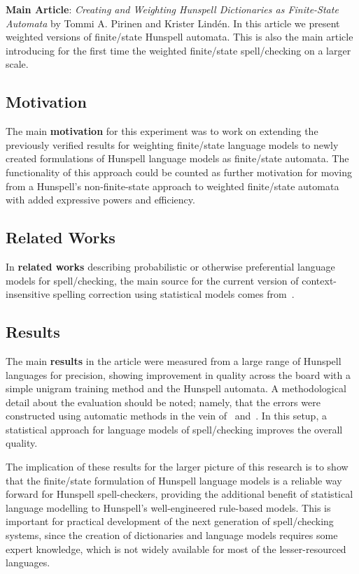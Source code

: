 \documentclass[officiallayout,final]{unihelcompling}
\begin{document}
\textbf{Main Article}: \emph{Creating and Weighting Hunspell Dictionaries as
Finite-State Automata} by Tommi A. Pirinen and Krister Lindén. In this article
we present weighted versions of finite\-/state Hunspell automata. This is also
the main article introducing for the first time the weighted finite\-/state
spell\-/checking on a larger scale.

\subsection{Motivation}

The main \textbf{motivation} for this experiment was to work on extending the
previously verified results for weighting finite\-/state language models to
newly created formulations of Hunspell language models as finite\-/state
automata. The functionality of this approach could be counted as further
motivation for moving from a Hunspell's non-finite-state approach to weighted
finite\-/state automata with added expressive powers and efficiency.

\subsection{Related Works}

In \textbf{related works} describing probabilistic or otherwise preferential
language models for spell\-/checking, the main source for the current version
of context-insensitive spelling correction using statistical models comes
from~\citet{church1991probability}.

\subsection{Results}

The main \textbf{results} in the article were measured from a large range of
Hunspell languages for precision, showing improvement in quality across the
board with a simple unigram training method and the Hunspell automata. A
methodological detail about the evaluation should be noted; namely, that the
errors were constructed using automatic methods in the vein
of~\citep{bigert2003autoeval} and~\citep{bigert2005automatic}. In this setup,
a statistical approach for language models of spell\-/checking improves the
overall quality.

The implication of these results for the larger picture of this research is to
show that the finite\-/state formulation of Hunspell language models is a
reliable way forward for Hunspell spell-checkers, providing the additional
benefit of statistical language modelling to Hunspell's well-engineered
rule-based models. This is important for practical development of the next
generation of spell\-/checking systems, since the creation of dictionaries and
language models requires some expert knowledge, which is not widely available
for most of the lesser-resourced languages.
\end{document}
